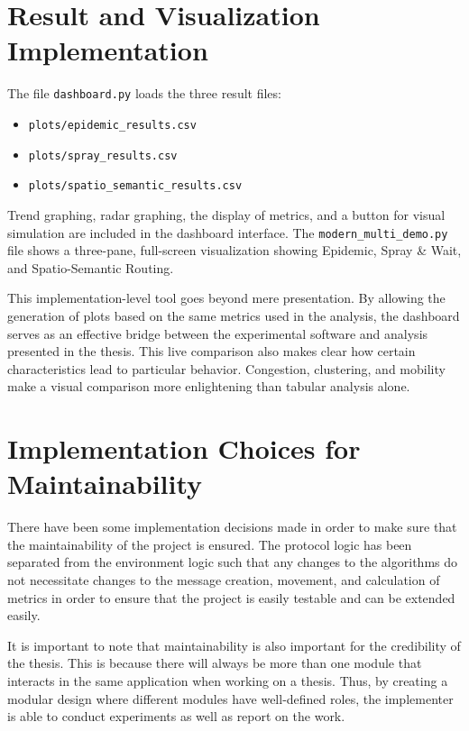 \section{Result and Visualization Implementation}
The file \verb|dashboard.py| loads the three result files:

\begin{itemize}
	\item \verb|plots/epidemic_results.csv|
	\item \verb|plots/spray_results.csv|
	\item \verb|plots/spatio_semantic_results.csv|
\end{itemize}

Trend graphing, radar graphing, the display of metrics, and a button for visual simulation are included in the dashboard interface. The \verb|modern_multi_demo.py| file shows a three-pane, full-screen visualization showing Epidemic, Spray \& Wait, and Spatio-Semantic Routing.

This implementation-level tool goes beyond mere presentation. By allowing the generation of plots based on the same metrics used in the analysis, the dashboard serves as an effective bridge between the experimental software and analysis presented in the thesis. This live comparison also makes clear how certain characteristics lead to particular behavior. Congestion, clustering, and mobility make a visual comparison more enlightening than tabular analysis alone.

\section{Implementation Choices for Maintainability}
There have been some implementation decisions made in order to make sure that the maintainability of the project is ensured. The protocol logic has been separated from the environment logic such that any changes to the algorithms do not necessitate changes to the message creation, movement, and calculation of metrics in order to ensure that the project is easily testable and can be extended easily.

It is important to note that maintainability is also important for the credibility of the thesis. This is because there will always be more than one module that interacts in the same application when working on a thesis. Thus, by creating a modular design where different modules have well-defined roles, the implementer is able to conduct experiments as well as report on the work.

